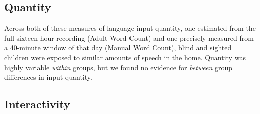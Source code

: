 \documentclass[
  man,floatsintext]{apa6}
\begin{document}
\hypertarget{quantity-1}{%
\subsection{Quantity}\label{quantity-1}}

Across both of these measures of language input quantity, one estimated from the full sixteen hour recording (Adult Word Count) and one precisely measured from a 40-minute window of that day (Manual Word Count), blind and sighted children were exposed to similar amounts of speech in the home. Quantity was highly variable \emph{within} groups, but we found no evidence for \emph{between} group differences in input quantity.

\hypertarget{interactivity-2}{%
\subsection{Interactivity}\label{interactivity-2}}
\end{document}

